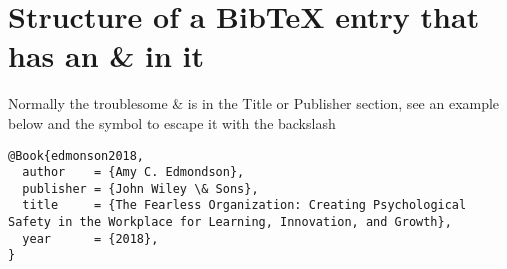 \documentclass[12pt]{article}
\begin{document}
\section{Structure of a BibTeX entry that has an \& in it}

Normally the troublesome \& is in the Title or Publisher section, see an example below and the symbol to escape it with the backslash

\begin{lstlisting}
@Book{edmonson2018,
  author    = {Amy C. Edmondson},
  publisher = {John Wiley \& Sons},
  title     = {The Fearless Organization: Creating Psychological Safety in the Workplace for Learning, Innovation, and Growth},
  year      = {2018},
}

\end{lstlisting}







\end{document}
